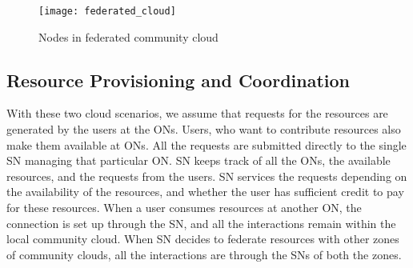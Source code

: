 \begin{figure}[tbp]
	\centering
	\texttt{[image: federated\_cloud]}
	\caption{Nodes in federated community cloud}
	\label{fig:federated_cloud}
\end{figure}

\subsection{Resource Provisioning and Coordination}

With these two cloud scenarios, we assume that requests for the resources are generated by the users at the ONs.
Users, who want to contribute resources also make them available at ONs.
All the requests are submitted directly to the single SN managing that particular ON.
SN keeps track of all the ONs, the available resources, and the requests from the users.
SN services the requests depending on the availability of the resources, 
and whether the user has sufficient credit to pay for these resources. 
When a user consumes resources at another ON, the connection is set up through the SN, and all the interactions remain within the local community cloud.
When SN decides to federate resources with other zones of community clouds, all the interactions are through the SNs of both the zones.



